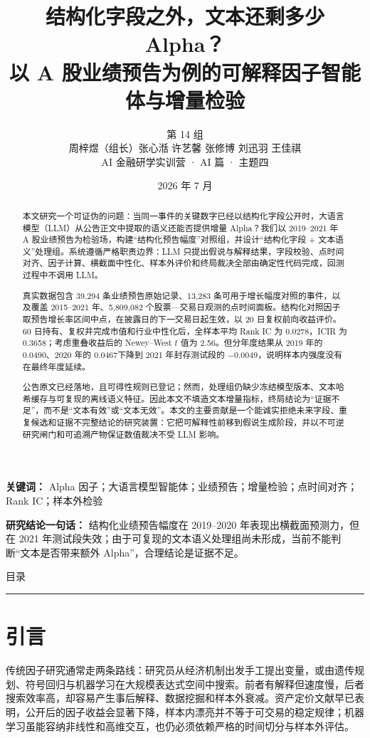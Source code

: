 \documentclass[UTF8,zihao=-4]{ctexart}
\title{结构化字段之外，文本还剩多少 Alpha？\\
\large 以 A 股业绩预告为例的可解释因子智能体与增量检验}
\author{第 14 组\\[2pt]
周梓煜（组长）\quad 张心湉 \quad 许艺馨 \quad 张修博 \quad 刘迅羽 \quad 王佳祺\\[2pt]
\small AI 金融研学实训营 · AI 篇 · 主题四}
\date{2026 年 7 月}
\makeatletter
\newcommand{\customtoc}{%
  \clearpage
  \begin{center}
    {\heiti\fontsize{20}{26}\selectfont\color{accent}目\hspace{0.8em}录}\\[7pt]
    {\color{rulegold}\rule{4.2cm}{1.1pt}}
  \end{center}
  \vspace{16pt}
  \@starttoc{toc}
  \clearpage}
\theoremstyle{accentthm}
\makeatother
\begin{document}


\begin{abstract}
\noindent
本文研究一个可证伪的问题：当同一事件的关键数字已经以结构化字段公开时，大语言模型（LLM）从公告正文中提取的语义还能否提供增量 Alpha？我们以 2019--2021 年 A 股业绩预告为检验场，构建“结构化预告幅度”对照组，并设计“结构化字段 + 文本语义”处理组。系统遵循严格职责边界：LLM 只提出假说与解释结果，字段校验、点时间对齐、因子计算、横截面中性化、样本外评价和终局裁决全部由确定性代码完成，回测过程中不调用 LLM。

真实数据包含 39,294 条业绩预告原始记录、13,283 条可用于增长幅度对照的事件，以及覆盖 2015--2021 年、5,809,082 个股票—交易日观测的点时间面板。结构化对照因子取预告增长率区间中点，在披露日的下一交易日起生效，以 20 日复权前向收益评价。60 日持有、复权并完成市值和行业中性化后，全样本平均 Rank IC 为 0.0278，ICIR 为 0.3658；考虑重叠收益后的 Newey--West $t$ 值为 2.56。但分年度结果从 2019 年的 0.0490、2020 年的 0.0467下降到 2021 年封存测试段的 $-0.0049$，说明样本内强度没有在最终年度延续。

公告原文已经落地，且可得性规则已登记；然而，处理组仍缺少冻结模型版本、文本哈希缓存与可复现的离线语义特征。因此本文不填造文本增量指标，终局结论为“证据不足”，而不是“文本有效”或“文本无效”。本文的主要贡献是一个能诚实拒绝未来字段、重复候选和证据不完整结论的研究装置：它把可解释性前移到假说生成阶段，并以不可逆研究闸门和可追溯产物保证数值裁决不受 LLM 影响。
\end{abstract}

\noindent\textbf{关键词：} Alpha 因子；大语言模型智能体；业绩预告；增量检验；点时间对齐；Rank IC；样本外检验

\begin{center}
\begin{minipage}{0.94\linewidth}
\small
\textbf{研究结论一句话：}
结构化业绩预告幅度在 2019--2020 年表现出横截面预测力，但在 2021 年测试段失效；由于可复现的文本语义处理组尚未形成，当前不能判断“文本是否带来额外 Alpha”，合理结论是证据不足。
\end{minipage}
\end{center}

\customtoc

\section{引言}

传统因子研究通常走两条路线：研究员从经济机制出发手工提出变量，或由遗传规划、符号回归与机器学习在大规模表达式空间中搜索。前者有解释但速度慢，后者搜索效率高，却容易产生事后解释、数据挖掘和样本外衰减。资产定价文献早已表明，公开后的因子收益会显著下降，样本内漂亮并不等于可交易的稳定规律\cite{mclean2016}；机器学习虽能容纳非线性和高维交互，也仍必须依赖严格的时间切分与样本外评估\cite{gkx2020}。
\end{document}
